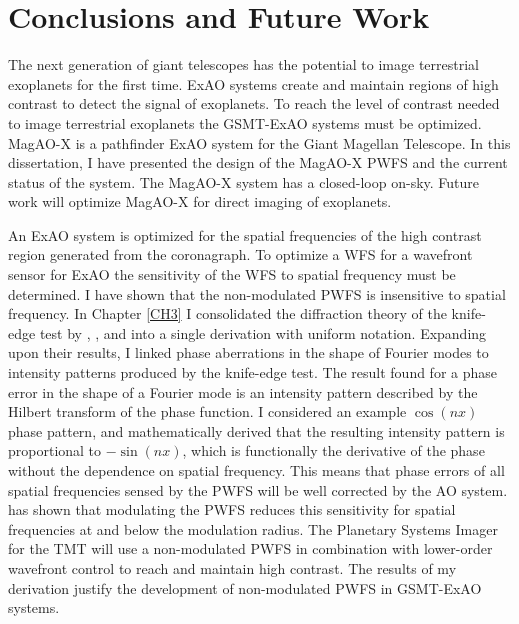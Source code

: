 \chapter{Conclusions and Future Work}\label{CH7}

The next generation of giant telescopes has the potential to image terrestrial exoplanets for the first time. ExAO systems create and maintain regions of high contrast to detect the signal of exoplanets. To reach the level of contrast needed to image terrestrial exoplanets the GSMT-ExAO systems must be optimized. MagAO-X is a pathfinder ExAO system for the Giant Magellan Telescope. In this dissertation, I have presented the design of the MagAO-X PWFS and the current status of the system. The MagAO-X system has a closed-loop on-sky. Future work will optimize MagAO-X for direct imaging of exoplanets.  


An ExAO system is optimized for the spatial frequencies of the high contrast region generated from the coronagraph. To optimize a WFS for a wavefront sensor for ExAO the sensitivity of the WFS to spatial frequency must be determined. I have shown that the non-modulated PWFS is insensitive to spatial frequency. In Chapter \ref{CH3} I consolidated the diffraction theory of the knife-edge test by \cite{linfoot1948theory}, \cite{katzoff1971quantitative}, and \cite{wilson1975wavefront} into a single derivation with uniform notation. Expanding upon their results, I linked phase aberrations in the shape of Fourier modes to intensity patterns produced by the knife-edge test. The result found for a phase error in the shape of a Fourier mode is an intensity pattern described by the Hilbert transform of the phase function. I considered an example $\cos(nx)$ phase pattern, and mathematically derived that the resulting intensity pattern is proportional to $-\sin(nx)$, which is functionally the derivative of the phase without the dependence on spatial frequency. This means that phase errors of all spatial frequencies sensed by the PWFS will be well corrected by the AO system. \cite{verinaud2004nature} has shown that modulating the PWFS reduces this sensitivity for spatial frequencies at and below the modulation radius. The Planetary Systems Imager \citep{fitzgerald2019planetary} for the TMT will use a non-modulated PWFS \citep{guyon2018wavefront} in combination with lower-order wavefront control to reach and maintain high contrast. The results of my derivation justify the development of non-modulated PWFS in GSMT-ExAO systems.

